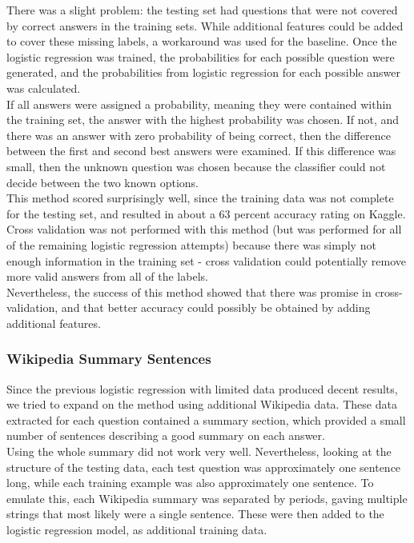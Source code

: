 \documentclass{article}
\theoremstyle{mystuff}
\theoremstyle{myexample}
\theoremstyle{named}
\begin{document}
There was a slight problem: the testing set had questions that were not covered by correct answers in the training sets.  While additional features could be added to cover these missing labels, a workaround was used for the baseline.  Once the logistic regression was trained, the probabilities for each possible question were generated, and the probabilities from logistic regression for each possible answer was calculated. \\

 If all answers were assigned a probability, meaning they were contained within the training set, the answer with the highest probability was chosen.  If not, and there was an answer with zero probability of being correct, then the difference between the first and second best answers were examined.  If this difference was small, then the unknown question was chosen because the classifier could not decide between the two known options. \\

This method scored surprisingly well, since the training data was not complete for the testing set, and resulted in about a 63 percent accuracy rating on Kaggle.  Cross validation was not performed with this method (but was performed for all of the remaining logistic regression attempts) because there was simply not enough information in the training set - cross validation could potentially remove more valid answers from all of the labels.  \\

Nevertheless, the success of this method showed that there was promise in cross-validation, and that better accuracy could possibly be obtained by adding additional features.

\subsubsection{Wikipedia Summary Sentences}
Since the previous logistic regression with limited data produced decent results, we tried to expand on the method using additional Wikipedia data.  These data extracted for each question contained a summary section, which provided a small number of sentences describing a good summary on each answer.\\

Using the whole summary did not work very well.  Nevertheless, looking at the structure of the testing data, each test question was approximately one sentence long, while each training example was also approximately one sentence.  To emulate this, each Wikipedia summary was separated by periods, gaving multiple strings that most likely were a single sentence.  These were then added to the logistic regression model, as additional training data.\\
\end{document}
